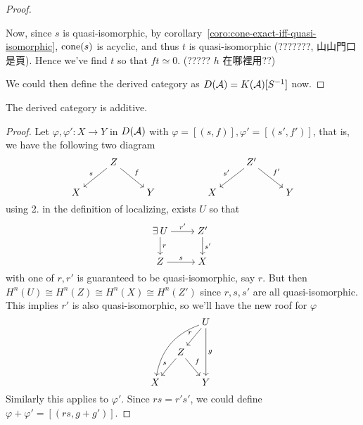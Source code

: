 \begin{theorem}
\begin{proof}
\begin{enumerate}
        Now, since $s$ is quasi-isomorphic, by corollary~\ref{coro:cone-exact-iff-quasi-isomorphic},
        $\operatorname{cone}(s)$ is acyclic, and thus $t$ is quasi-isomorphic (???????, 山山門口是頁).
        Hence we've find $t$ so that $ft \simeq 0$. (????? $h$ 在哪裡用??)
    \end{enumerate}
    We could then define the derived category as $D(\mathcal{A}) = K(\mathcal{A})[S^{-1}]$ now.
  \end{proof}
\end{theorem}

\begin{prop}
  The derived category is additive.

  \begin{proof}
    Let $\varphi, \varphi' : X \to Y$ in $D(\mathcal{A})$ with
    $\varphi = [(s, f)], \varphi' = [(s', f')]$, that is, we have the following two diagram
    \[ \begin{tikzcd}[cramped]
        & Z \ar[ld, "s"'] \ar[rd, "f"] & & & & Z' \ar[ld, "s'"'] \ar[rd, "f'"] & \\
        X &   & Y & & X & & Y 
      \end{tikzcd} \]
    using 2. in the definition of localizing,
    exists $U$ so that
    \[ \begin{tikzcd}[cramped]
        \exists U \ar[r, "r'"] \ar[d, "r"] & Z' \ar[d, "s'"] \\
        Z \ar[r, "s"] & X
      \end{tikzcd} \]
    with one of $r, r'$ is guaranteed to be quasi-isomorphic, say $r$.
    But then $H^n(U) \cong H^n(Z) \cong H^n(X) \cong H^n(Z')$
    since $r, s, s'$ are all quasi-isomorphic. This implies $r'$
    is also quasi-isomorphic, so we'll have the new roof for $\varphi$
    \[ \begin{tikzcd}[cramped, column sep=small]
        & & U \ar[ld, "r"'] \ar[lldd, bend right] \ar[dd, "g"] \\
        & Z \ar[ld, "s"'] \ar[rd, "f"] & \\
        X & & Y
      \end{tikzcd} \]
    Similarly this applies to $\varphi'$. Since $rs = r's'$, we could
    define $\varphi + \varphi' = [(rs, g+g')]$.
  \end{proof}
\end{prop}
